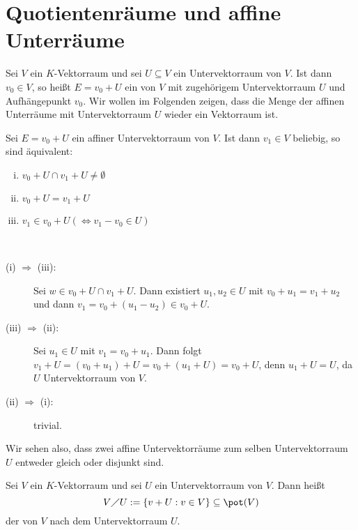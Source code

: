 \section{Quotientenräume und affine Unterräume}
\label{sec:2.11}

Sei $V$ ein $K$-Vektorraum und sei $U \subseteq V$ ein Untervektorraum von $V$.
Ist dann $v_0 \in V$, so heißt $E = v_0 + U$ ein  von $V$ mit zugehörigem Untervektorraum $U$ und Aufhängepunkt $v_0$.
Wir wollen im Folgenden zeigen, dass die Menge der affinen Unterräume mit Untervektorraum $U$ wieder ein Vektorraum ist.

\begin{lemma}
	\label{lemma:11.1}
	Sei $E = v_0 + U$ ein affiner Untervektorraum von $V$.
	Ist dann $v_1 \in V$ beliebig, so sind äquivalent:
	\begin{enumerate}[(i)]
		\item $v_0 + U \cap v_1 + U \neq \emptyset$ 
		\item $v_0 + U = v_1 + U$
		\item $v_1 \in v_0 + U (\Leftrightarrow v_1 - v_0 \in U)$
	\end{enumerate}
\end{lemma}

\begin{beweis}
	\mbox{} \\[-.9cm]
	\begin{description}
		\item[(i) $\Rightarrow$ (iii):] Sei $w \in v_0 + U \cap v_1 + U$.
		Dann existiert $u_1, u_2 \in U$ mit $v_0 + u_1 = v_1 + u_2$ und dann $v_1 = v_0 + (u_1 - u_2) \in v_0 + U$.
		\item[(iii) $\Rightarrow$ (ii):] Sei $u_1 \in U$ mit $v_1 = v_0 + u_1$.
		Dann folgt $v_1 + U = (v_0 + u_1) + U = v_0 + (u_1 + U) = v_0 + U$, denn $u_1 + U = U$, da $U$ Untervektorraum von $V$.
		\item[(ii) $\Rightarrow$ (i):] trivial. 
	\end{description}
\end{beweis}

Wir sehen also, dass zwei affine Untervektorräume zum selben Untervektorraum $U$ entweder gleich oder disjunkt sind.

\begin{definition}[Quotientenraum]
	\label{def:11.2}
	Sei $V$ ein $K$-Vektorraum und sei $U$ ein Untervektorraum von $V$.
	Dann heißt
	\[
		V \diagup U := \{v + U : v \in V\} \subseteq \pot(V)
	\]
	der  von $V$ nach dem Untervektorraum $U$.
\end{definition}

